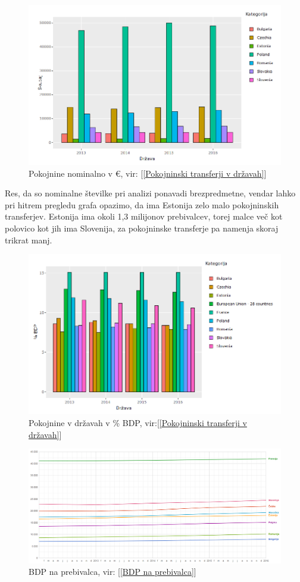 \documentclass[12pt, a4paper]{article}
\begin{document}
\begin{figure}[h!]
\centering
\includegraphics[height = 6 cm, width = 12 cm]{pokojnine_nominalno.png}
\caption{Pokojnine nominalno v \euro, vir: [\ref{Pokojninski transferji v državah}]}
\label{Slika 9}
\end{figure}

\hspace*{5mm} Res, da so nominalne številke pri analizi ponavadi brezpredmetne, vendar lahko pri hitrem pregledu grafa opazimo, da ima Estonija zelo malo pokojninskih transferjev. Estonija ima okoli 1,3 milijonov prebivalcev, torej malce več kot polovico kot jih ima Slovenija, za pokojninske transferje pa namenja skoraj trikrat manj. 

\begin{figure}[h!]
\centering
\includegraphics[height = 6 cm, width = 12 cm]{pokojnine_bdp.png}
\caption{Pokojnine v državah v \% BDP, vir:[\ref{Pokojninski transferji v državah}]}
\label{Slika 10}
\end{figure}


\begin{figure}[h!]
\centering
\includegraphics[width = 14 cm]{bdp_per_capita.png}
\caption{BDP na prebivalca, vir: [\ref{BDP na prebivalca}]}
\label{Slika 11}
\end{figure}
\end{document}
